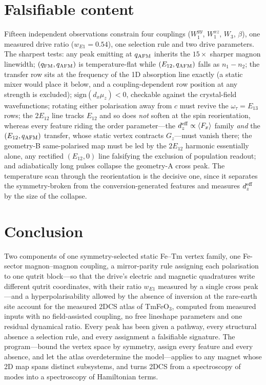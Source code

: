 \documentclass[aps,prb,twocolumn,superscriptaddress,longbibliography]{revtex4-2}
\newcommand{\qafm}{q_{\rm AFM}}
\newcommand{\qfm}{q_{\rm FM}}
\begin{document}
\section{Falsifiable content}

Fifteen independent observations constrain four couplings
($W^{yy}_1$, $W^{xz}_1$, $W_3$, $\beta$), one measured drive ratio
($w_{E1}=0.54$), one selection rule and two drive parameters.  The
sharpest tests: any peak emitting at $\qafm$ inherits the $15\times$
sharper magnon linewidth; $(\qfm,\qafm)$ is temperature-flat while
$(E_{12},\qafm)$ falls as $n_1-n_2$; the transfer row sits at the
frequency of the 1D absorption line exactly (a static mixer would place
it below, and a coupling-dependent row position at any strength is
excluded); $\mathrm{sign}(d_x\mu_z)<0$, checkable against the
crystal-field wavefunctions; rotating either polarisation away from $c$
must revive the $\omega_\tau=E_{13}$ rows; the $2E_{12}$ line tracks
$E_{12}$ and so does \emph{not} soften at the spin reorientation,
whereas every feature riding the order parameter---the
$d_z^{\rm eff}\propto\langle F_x\rangle$ family \emph{and} the
$(E_{12},\qafm)$ transfer, whose static vertex contracts
$G_z$---must vanish there; the geometry-B same-polarised map must be
led by the $2E_{12}$ harmonic essentially alone, any rectified
$(E_{12},0)$ line falsifying the exclusion of population readout; and
adiabatically long pulses collapse the geometry-A cross peak.  The
temperature scan through the reorientation is the decisive one, since
it separates the symmetry-broken from the conversion-generated features
and measures $d_z^{\rm eff}$ by the size of the collapse.

\section{Conclusion}

Two components of one symmetry-selected static Fe--Tm vertex family,
one Fe-sector magnon--magnon coupling, a mirror-parity rule assigning
each polarisation to one qutrit block---so that the drive's electric
and magnetic quadratures write different qutrit coordinates, with their
ratio $w_{E1}$ measured by a single cross peak---and a
hyperpolarisability allowed by the absence of inversion at the
rare-earth site account for the measured 2DCS atlas of TmFeO$_3$,
computed from measured inputs with no field-assisted coupling, no free
lineshape parameters and one residual dynamical ratio.  Every peak has been given a pathway, every
structural absence a selection rule, and every assignment a falsifiable
signature.  The program---bound the vertex space by symmetry, assign
every feature and every absence, and let the atlas overdetermine the
model---applies to any magnet whose 2D map spans distinct subsystems, and
turns 2DCS from a spectroscopy of modes into a spectroscopy of
Hamiltonian terms.
\end{document}
